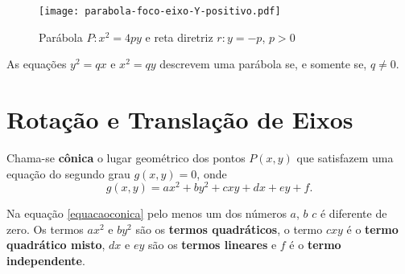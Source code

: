 \begin{figure}[!h]%
  \centering
  \caption{Par\'abola $P: x^2 = 4py$ e reta diretriz $r: y = -p$, $p > 0$}
  \texttt{[image: parabola-foco-eixo-Y-positivo.pdf]}
\end{figure}

\begin{proposicao}
  As equa\c{c}\~oes $y^2 = qx$ e $x^2 = qy$ descrevem uma par\'abola se, e somente se, $q \ne 0$.
\end{proposicao}

\section{Rota\c{c}\~ao e Transla\c{c}\~ao de Eixos} %
\label{sec:rotacao_e_translacao_de_eixos}

\begin{definicao}
  Chama-se \textbf{c\^onica} o lugar geom\'etrico dos pontos $P(x,y)$ que satisfazem uma equa\c{c}\~ao do segundo grau $g(x,y) = 0$, onde
  \begin{equation}\label{equacaoconica}
    g(x,y) = ax^2 + by^2 + cxy + dx + ey + f.
  \end{equation}
\end{definicao}

Na equa\c{c}\~ao \eqref{equacaoconica} pelo menos um dos n\'umeros $a$, $b$ $c$ \'e diferente de zero. Os termos $ax^2$ e $by^2$ s\~ao os \textbf{termos quadr\'aticos}, o termo $cxy$ \'e o \textbf{termo quadr\'atico misto}, $dx$ e $ey$ s\~ao os \textbf{termos lineares} e $f$ \'e o \textbf{termo independente}.    

